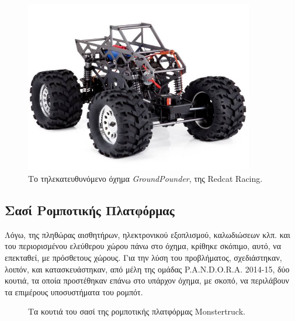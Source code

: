 \begin{figure}[!ht]
	\begin{center}
		\includegraphics[width=10cm]{Chapters/Chapter2/Figures/groundpounder.jpg}
		\caption{Το τηλεκατευθυνόμενο όχημα \textit{GroundPounder}, της Redcat Racing.}
		\label{fig:groundpounder}
	\end{center}
\end{figure}

\bigskip
\subsection{Σασί Ρομποτικής Πλατφόρμας} \label{ssec:chassis}
Λόγω, της πληθώρας αισθητήρων, ηλεκτρονικού εξοπλισμού, καλωδιώσεων κλπ. και του περιορισμένου ελεύθερου χώρου πάνω στο όχημα, κρίθηκε σκόπιμο, αυτό, να επεκταθεί, με πρόσθετους χώρους. Για την λύση του προβλήματος, σχεδιάστηκαν, λοιπόν, και κατασκευάστηκαν, από μέλη της ομάδας P.A.N.D.O.R.A. 2014-15, δύο κουτιά, τα οποία προστέθηκαν επάνω στο υπάρχον όχημα, με σκοπό, να περιλάβουν τα επιμέρους υποσυστήματα του ρομπότ.

\begin{figure}[!ht]
	\centering
	\caption{Τα κουτιά του σασί της ρομποτικής πλατφόρμας Monstertruck.}
\end{figure}


